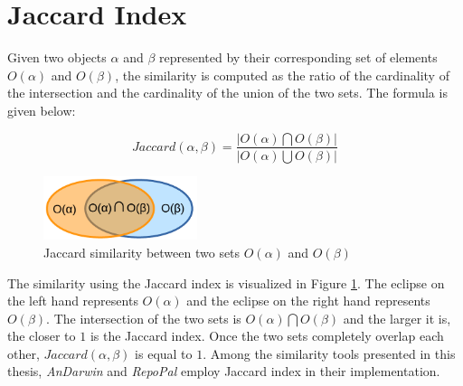 \section{Jaccard Index}\label{sec:jaccard}

Given two objects $\alpha$ and $\beta$ represented by their corresponding set of elements $O(\alpha)$ and $O(\beta)$, the similarity is computed as the ratio of the cardinality of the intersection and the cardinality of the union of the two sets. The formula is given below:

\begin{equation} \label{eqn:Jaccard}
Jaccard(\alpha,\beta)=\frac{|O(\alpha)\bigcap O(\beta)|}{|O(\alpha)\bigcup O(\beta)|} 
\end{equation}

\begin{figure}[h!]
	\centering
	\includegraphics[width=0.4\textwidth]{images/JaccardSimilarity.pdf}
	\caption{Jaccard similarity between two sets $O(\alpha)$ and $O(\beta)$}
	\label{fig:Jaccard}
\end{figure}

The similarity using the Jaccard index is visualized in Figure \ref{fig:Jaccard}. The eclipse on the left hand represents $O(\alpha)$ and the eclipse on the right hand represents $O(\beta)$. The intersection of the two sets is $O(\alpha)\bigcap O(\beta)$ and the larger it is, the closer to $1$ is the Jaccard index. Once the two sets completely overlap each other, $Jaccard(\alpha,\beta)$ is equal to $1$. Among the similarity tools presented in this thesis, \textit{AnDarwin} \cite{Crussell2013} and \textit{RepoPal} \cite{10.1109/SANER.2017.7884605} employ Jaccard index in their implementation. %



